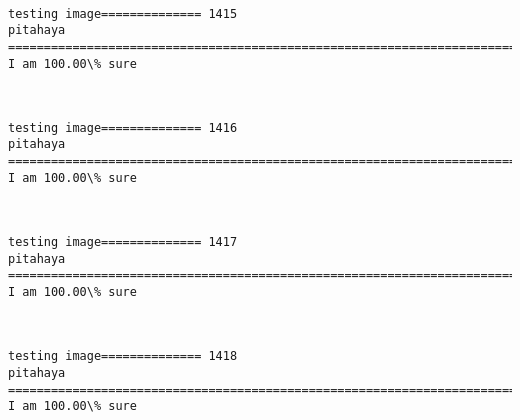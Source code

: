 \documentclass[11pt]{article}
\begin{document}
    \begin{center}
    \end{center}
    { \hspace*{\fill} \\}
    
    \begin{Verbatim}[commandchars=\\\{\}]
testing image============== 1415
pitahaya
============================================================================
I am 100.00\% sure

    \end{Verbatim}

    \begin{center}
    \end{center}
    { \hspace*{\fill} \\}
    
    \begin{Verbatim}[commandchars=\\\{\}]
testing image============== 1416
pitahaya
============================================================================
I am 100.00\% sure

    \end{Verbatim}

    \begin{center}
    \end{center}
    { \hspace*{\fill} \\}
    
    \begin{Verbatim}[commandchars=\\\{\}]
testing image============== 1417
pitahaya
============================================================================
I am 100.00\% sure

    \end{Verbatim}

    \begin{center}
    \end{center}
    { \hspace*{\fill} \\}
    
    \begin{Verbatim}[commandchars=\\\{\}]
testing image============== 1418
pitahaya
============================================================================
I am 100.00\% sure

    \end{Verbatim}
\end{document}
